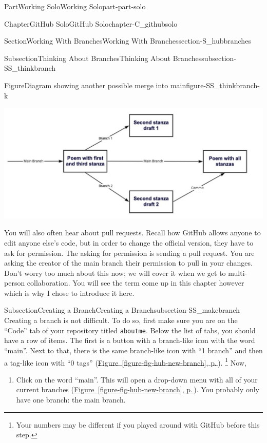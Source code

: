 \documentclass[twoside,10pt,]{book}
\newcommand{\xreffont}{\relax}
\newcommand{\mono}[1]{\texttt{#1}}
\begin{document}
\begin{partptx}{Part}{Working Solo}{}{Working Solo}{}{}{part-part-solo}
\begin{chapterptx}{Chapter}{GitHub Solo}{}{GitHub Solo}{}{}{chapter-C_githubsolo}
\begin{sectionptx}{Section}{Working With Branches}{}{Working With Branches}{}{}{section-S_hubbranches}
\begin{subsectionptx}{Subsection}{Thinking About Branches}{}{Thinking About Branches}{}{}{subsection-SS_thinkbranch}
\begin{figureptx}{Figure}{Diagram showing another possible merge into main}{figure-SS_thinkbranch-k}{}
\begin{image}{0.05}{0.9}{0.05}{}
\includegraphics[width=\linewidth]{external/merge_poem2.pdf}
\end{image}%
\tcblower
\end{figureptx}%
You will also often hear about pull requests. Recall how GitHub allows anyone to edit anyone else's code, but in order to change the official version, they have to ask for permission. The asking for permission is sending a pull request. You are asking the creator of the main branch their permission to pull in your changes. Don't worry too much about this now; we will cover it when we get to multi-person collaboration. You will see the term come up in this chapter however which is why I chose to introduce it here.%
\end{subsectionptx}
%
%
\typeout{************************************************}
\typeout{************************************************}
%
\begin{subsectionptx}{Subsection}{Creating a Branch}{}{Creating a Branch}{}{}{subsection-SS_makebranch}
%
%
Creating a branch is not difficult. To do so, first make sure you are on the ``Code'' tab of your repository titled \mono{aboutme}. Below the list of tabs, you should have a row of items. The first is a button with a branch-like icon with the word ``main''. Next to that, there is the same branch-like icon with ``1 branch'' and then a tag-like icon with ``0 tags'' (\hyperref[figure-fig-hub-new-branch]{Figure~{\xreffont\ref{figure-fig-hub-new-branch}}, p.\,\pageref{figure-fig-hub-new-branch}}). \footnote{Your numbers may be different if you played around with GitHub before this step.\label{fn-SS_makebranch-d-g}} Now,%
\begin{enumerate}
\item{}Click on the word ``main''. This will open a drop-down menu with all of your current branches (\hyperref[figure-fig-hub-new-branch]{Figure~{\xreffont\ref{figure-fig-hub-new-branch}}, p.\,\pageref{figure-fig-hub-new-branch}}). You probably only have one branch: the main branch.%

\end{enumerate}
\end{subsectionptx}
\end{sectionptx}
\end{chapterptx}
\end{partptx}
\end{document}
